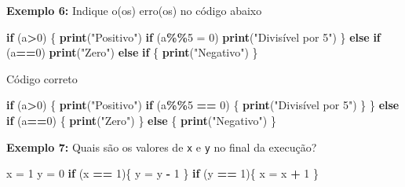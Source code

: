 \documentclass[
]{book}
\newenvironment{Shaded}{\begin{snugshade}}{\end{snugshade}}
\newcommand{\ControlFlowTok}[1]{\textcolor[rgb]{0.13,0.29,0.53}{\textbf{#1}}}
\newcommand{\DecValTok}[1]{\textcolor[rgb]{0.00,0.00,0.81}{#1}}
\newcommand{\FunctionTok}[1]{\textcolor[rgb]{0.13,0.29,0.53}{\textbf{#1}}}
\newcommand{\NormalTok}[1]{#1}
\newcommand{\OtherTok}[1]{\textcolor[rgb]{0.56,0.35,0.01}{#1}}
\newcommand{\SpecialCharTok}[1]{\textcolor[rgb]{0.81,0.36,0.00}{\textbf{#1}}}
\newcommand{\StringTok}[1]{\textcolor[rgb]{0.31,0.60,0.02}{#1}}
\begin{document}
\textbf{Exemplo 6:} Indique o(os) erro(os) no código abaixo

\begin{Shaded}
\begin{Highlighting}[]
\ControlFlowTok{if}\NormalTok{ (a}\SpecialCharTok{\textgreater{}}\DecValTok{0}\NormalTok{) \{  }
  \FunctionTok{print}\NormalTok{(}\StringTok{"Positivo"}\NormalTok{)  }
  \ControlFlowTok{if}\NormalTok{ (a}\SpecialCharTok{\%\%}\DecValTok{5} \OtherTok{=} \DecValTok{0}\NormalTok{)     }
    \FunctionTok{print}\NormalTok{(}\StringTok{"Divisível por 5"}\NormalTok{)    }
\NormalTok{\} }\ControlFlowTok{else} \ControlFlowTok{if}\NormalTok{ (a}\SpecialCharTok{==}\DecValTok{0}\NormalTok{)   }
    \FunctionTok{print}\NormalTok{(}\StringTok{"Zero"}\NormalTok{)}
  \ControlFlowTok{else} \ControlFlowTok{if}\NormalTok{ \{  }
    \FunctionTok{print}\NormalTok{(}\StringTok{"Negativo"}\NormalTok{)}
\NormalTok{\}}
\end{Highlighting}
\end{Shaded}

Código correto

\begin{Shaded}
\begin{Highlighting}[]
\ControlFlowTok{if}\NormalTok{ (a}\SpecialCharTok{\textgreater{}}\DecValTok{0}\NormalTok{) \{  }
  \FunctionTok{print}\NormalTok{(}\StringTok{"Positivo"}\NormalTok{)  }
  \ControlFlowTok{if}\NormalTok{ (a}\SpecialCharTok{\%\%}\DecValTok{5} \SpecialCharTok{==} \DecValTok{0}\NormalTok{) \{    }
    \FunctionTok{print}\NormalTok{(}\StringTok{"Divisível por 5"}\NormalTok{)  }
\NormalTok{  \}}
\NormalTok{\} }\ControlFlowTok{else} \ControlFlowTok{if}\NormalTok{ (a}\SpecialCharTok{==}\DecValTok{0}\NormalTok{) \{  }
    \FunctionTok{print}\NormalTok{(}\StringTok{"Zero"}\NormalTok{)}
\NormalTok{\} }\ControlFlowTok{else}\NormalTok{ \{  }
    \FunctionTok{print}\NormalTok{(}\StringTok{"Negativo"}\NormalTok{)}
\NormalTok{\}}
\end{Highlighting}
\end{Shaded}

\textbf{Exemplo 7:} Quais são os valores de \texttt{x} e \texttt{y} no final da execução?

\begin{Shaded}
\begin{Highlighting}[]
\NormalTok{x }\OtherTok{=} \DecValTok{1}
\NormalTok{y }\OtherTok{=} \DecValTok{0}
\ControlFlowTok{if}\NormalTok{ (x }\SpecialCharTok{==} \DecValTok{1}\NormalTok{)\{  }
\NormalTok{  y }\OtherTok{=}\NormalTok{ y }\SpecialCharTok{{-}} \DecValTok{1}
\NormalTok{\}}
\ControlFlowTok{if}\NormalTok{ (y }\SpecialCharTok{==} \DecValTok{1}\NormalTok{)\{  }
\NormalTok{  x }\OtherTok{=}\NormalTok{ x }\SpecialCharTok{+} \DecValTok{1}
\NormalTok{\}}
\end{Highlighting}
\end{Shaded}
\end{document}
